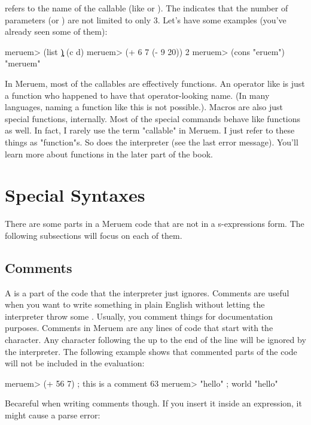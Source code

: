  refers to the name of the callable (like  or \code{++}). The  indicates that the number of parameters (or ) are not limited to only 3. Let's have some examples (you've already seen some of them):

\begin{REPL}
meruem> (list \c \d)
(c d)
meruem> (+ 6 7 (- 9 20))
2
meruem> (cons \m "eruem")
"meruem"
\end{REPL}

In Meruem, most of the callables are effectively functions. An operator like \code{+} is just a function who happened to have that operator-looking name. (In many languages, naming a function like this is not possible.). Macros are also just special functions, internally. Most of the special commands behave like functions as well. In fact, I rarely use the term "callable" in Meruem. I just refer to these things as "function"s. So does the interpreter (see the last error message). You'll learn more about functions in the later part of the book.

\section{Special Syntaxes}

There are some parts in a Meruem code that are not in a s-expressions form. The following subsections will focus on each of them.

\subsection{Comments}
A  is a part of the code that the interpreter just ignores. Comments are useful when you want to write something in plain English without letting the interpreter throw some . Usually, you comment things for documentation purposes. Comments in Meruem are any lines of code that start with the \code{;} character. Any character following the \code{;} up to the end of the line will be ignored by the interpreter. The following example shows that commented parts of the code will not be included in the evaluation:

\begin{REPL}
meruem> (+ 56 7) ; this is a comment
63
meruem> "hello" ; world
"hello"
\end{REPL}

Becareful when writing comments though. If you insert it inside an expression, it might cause a parse error:

